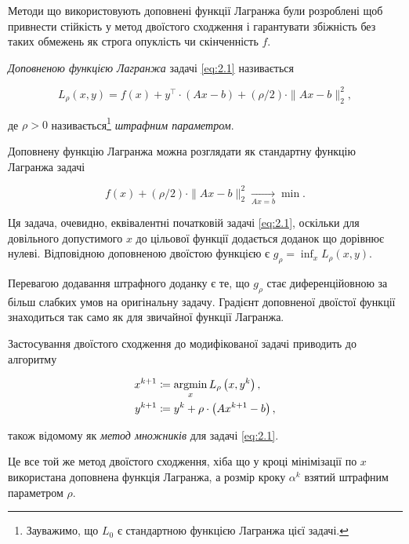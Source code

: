 Методи що використовують доповнені функції Лагранжа були розроблені щоб привнести стійкість у метод двоїстого сходження і гарантувати збіжність без таких обмежень як строга опуклість чи скінченність $f$. 

\begin{definition}
    \textit{Доповненою функцією Лагранжа} задачі \eqref{eq:2.1} називається

    \begin{equation}
    	\label{eq:2.6}
    	L_\rho (x, y) = 
    	f(x) + y^\intercal \cdot (A x - b) + (\rho / 2) \cdot \|A x - b\|_2^2,
    \end{equation}
    
    де $\rho > 0$ називається\footnote{Зауважимо, що $L_0$ є стандартною функцією Лагранжа цієї задачі.} \textit{штрафним параметром}.
\end{definition}

Доповнену функцію Лагранжа можна розглядати як стандартну функцію Лагранжа задачі

\begin{equation}
	f(x) + (\rho / 2) \cdot \| A x - b\|_2^2 \xrightarrow[A x = b]{} \min.
\end{equation}

Ця задача, очевидно, еквівалентні початковій задачі \eqref{eq:2.1}, оскільки для довільного допустимого $x$ до цільової функції додається доданок що дорівнює нулеві. Відповідною доповненою двоїстою функцією є $g_\rho = \inf_x L_\rho(x, y)$. \medskip

Перевагою додавання штрафного доданку є те, що $g_\rho$ стає диференційовною за більш слабких умов на оригінальну задачу. Градієнт доповненої двоїстої функції знаходиться так само як для звичайної функції Лагранжа. \medskip

Застосування двоїстого сходження до модифікованої задачі приводить до алгоритму

\begin{align}
	\label{eq:2.7}
	x^{k + 1} &\coloneqq \operatorname*{argmin}_x L_\rho \left( x, y^k \right), \\
	\label{eq:2.8}
	y^{k + 1} &\coloneqq y^k + \rho \cdot \left( A x^{k + 1} - b \right),
\end{align}

також відомому як \textit{метод множників} для задачі \eqref{eq:2.1}. \medskip

Це все той же метод двоїстого сходження, хіба що у кроці мінімізації по $x$ використана доповнена функція Лагранжа, а розмір кроку $\alpha^k$ взятий штрафним параметром $\rho$. 

